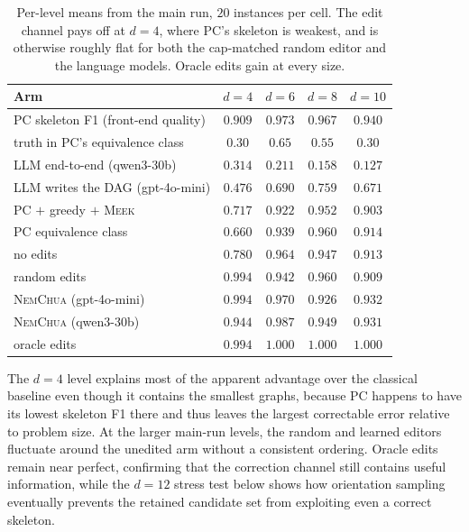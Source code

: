 \documentclass{article}
\newcommand{\nem}{\textsc{NemChua}}
\begin{document}
\begin{table}[h]
\caption{Per-level means from the main run, $20$ instances per cell. The edit channel pays off at
$d{=}4$, where PC's skeleton is weakest, and is otherwise roughly flat for both the cap-matched
random editor and the language models. Oracle edits gain at every size.}
\label{tab:levels_full}
\centering
\small
\setlength{\tabcolsep}{6pt}
\begin{tabular}{lcccc}
\toprule
Arm & $d{=}4$ & $d{=}6$ & $d{=}8$ & $d{=}10$ \\
\midrule
PC skeleton F1 (front-end quality) & $0.909$ & $0.973$ & $0.967$ & $0.940$ \\
truth in PC's equivalence class    & $0.30$  & $0.65$  & $0.55$  & $0.30$ \\
\midrule
LLM end-to-end (qwen3-30b)   & $0.314$ & $0.211$ & $0.158$ & $0.127$ \\
LLM writes the DAG (gpt-4o-mini) & $0.476$ & $0.690$ & $0.759$ & $0.671$ \\
PC $+$ greedy $+$ \textsc{Meek} & $0.717$ & $0.922$ & $0.952$ & $0.903$ \\
PC equivalence class          & $0.660$ & $0.939$ & $0.960$ & $0.914$ \\
no edits                      & $0.780$ & $0.964$ & $0.947$ & $0.913$ \\
random edits                  & $0.994$ & $0.942$ & $0.960$ & $0.909$ \\
\nem{} (gpt-4o-mini)          & $0.994$ & $0.970$ & $0.926$ & $0.932$ \\
\nem{} (qwen3-30b)            & $0.944$ & $0.987$ & $0.949$ & $0.931$ \\
oracle edits                  & $0.994$ & $1.000$ & $1.000$ & $1.000$ \\
\bottomrule
\end{tabular}
\end{table}

The $d{=}4$ level explains most of the apparent advantage over the classical baseline even though it
contains the smallest graphs, because PC happens to have its lowest skeleton F1 there and thus leaves
the largest correctable error relative to problem size. At the larger main-run levels, the random and
learned editors fluctuate around the unedited arm without a consistent ordering. Oracle edits remain
near perfect, confirming that the correction channel still contains useful information, while the
$d{=}12$ stress test below shows how orientation sampling eventually prevents
the retained candidate set from exploiting even a correct skeleton.
\end{document}
